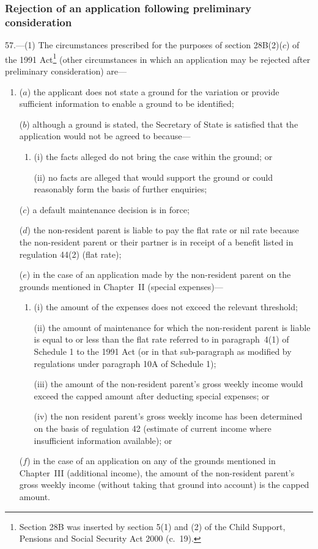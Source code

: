 \documentclass[12pt,a4paper]{article}
\begin{document}
\subsubsection[57. Rejection of an application following preliminary consideration]{Rejection of an application following preliminary consideration}

57.---(1)  The circumstances prescribed for the purposes of section 28B(2)($c$)  of the 1991 Act\footnote{Section 28B was inserted by section 5(1) and (2) of the Child Support, Pensions and Social Security Act 2000 (c.~19).} (other circumstances in which an application may be rejected after preliminary consideration) are—
\begin{enumerate}\item[]
($a$) the applicant does not state a ground for the variation or provide sufficient information to enable a ground to be identified;

($b$) although a ground is stated, the Secretary of State is satisfied that the application would not be agreed to because—
\begin{enumerate}\item[]
(i) the facts alleged do not bring the case within the ground; or

(ii) no facts are alleged that would support the ground or could reasonably form the basis of further enquiries;
\end{enumerate}

($c$) a default maintenance decision is in force;

($d$) the non-resident parent is liable to pay the flat rate or nil rate because the non-resident parent or their partner is in receipt of a benefit listed in regulation 44(2) (flat rate);

($e$) in the case of an application made by the non-resident parent on the grounds mentioned in Chapter~II (special expenses)—
\begin{enumerate}\item[]
(i) the amount of the expenses does not exceed the relevant threshold;

(ii) the amount of maintenance for which the non-resident parent is liable is equal to or less than the flat rate referred to in paragraph~4(1) of Schedule 1 to the 1991 Act (or in that sub-paragraph as modified by regulations under paragraph 10A of Schedule 1);

(iii) the amount of the non-resident parent’s gross weekly income would exceed the capped amount after deducting special expenses; or

(iv) the non resident parent’s gross weekly income has been determined on the basis of regulation 42 (estimate of current income where insufficient information available); or
\end{enumerate}

($f$) in the case of an application on any of the grounds mentioned in Chapter~III (additional income), the amount of the non-resident parent’s gross weekly income (without taking that ground into account) is the capped amount.
\end{enumerate}
\end{document}
